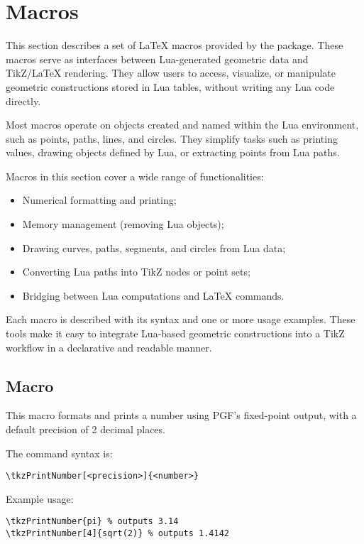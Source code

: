 \newpage
\section{Macros}

This section describes a set of LaTeX macros provided by the  package. These macros serve as interfaces between Lua-generated geometric data and TikZ/LaTeX rendering. They allow users to access, visualize, or manipulate geometric constructions stored in Lua tables, without writing any Lua code directly.

Most macros operate on objects created and named within the Lua environment, such as points, paths, lines, and circles. They simplify tasks such as printing values, drawing objects defined by Lua, or extracting points from Lua paths.

Macros in this section cover a wide range of functionalities:
\begin{itemize}
\item Numerical formatting and printing;
\item Memory management (removing Lua objects);
\item Drawing curves, paths, segments, and circles from Lua data;
\item Converting Lua paths into TikZ nodes or point sets;
\item Bridging between Lua computations and LaTeX commands.
\end{itemize}

Each macro is described with its syntax and one or more usage examples. These tools make it easy to integrate Lua-based geometric constructions into a TikZ workflow in a declarative and readable manner.


\subsection{Macro }
This macro formats and prints a number using PGF’s fixed-point output, with a default precision of 2 decimal places.

\medskip
\noindent
The command syntax is:

\begin{verbatim}
\tkzPrintNumber[<precision>]{<number>}
\end{verbatim}

\noindent
Example usage:

\begin{mybox}
\begin{verbatim}
\tkzPrintNumber{pi} % outputs 3.14
\tkzPrintNumber[4]{sqrt(2)} % outputs 1.4142
\end{verbatim}
\end{mybox}

